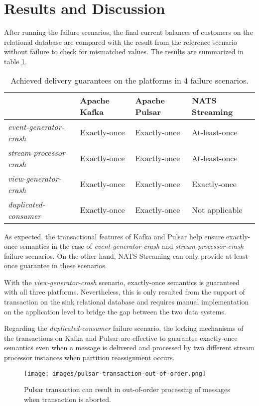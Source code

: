 \section{Results and Discussion}
After running the failure scenarios, the final current balances of customers on the relational database are compared with the result from the reference scenario without failure to check for mismatched values. The results are summarized in table \ref{fig:failurescenariosresult}.
\begin{table}[h]
	\centering
	\begin{tabular}{|l|l|l|l|}
		\hline
		& Apache Kafka & Apache Pulsar & NATS Streaming \\ \hline
		\textit{event-generator-crash}  & Exactly-once & Exactly-once  & At-least-once  \\ \hline
		\textit{stream-processor-crash} & Exactly-once & Exactly-once  & At-least-once  \\ \hline
		\textit{view-generator-crash}   & Exactly-once & Exactly-once  & Exactly-once   \\ \hline
		\textit{duplicated-consumer}    & Exactly-once & Exactly-once  & Not applicable \\ \hline
	\end{tabular}
	\caption{Achieved delivery guarantees on the platforms in 4 failure scenarios.}
	\label{fig:failurescenariosresult}
\end{table}

As expected, the transactional features of Kafka and Pulsar help ensure exactly-once semantics in the case of \emph{event-generator-crash} and \emph{stream-processor-crash} failure scenarios. On the other hand, NATS Streaming can only provide at-least-once guarantee in these scenarios.  

With the \emph{view-generator-crash} scenario, exactly-once semantics is guaranteed with all three platforms. Nevertheless, this is only resulted from the support of transaction on the sink relational database and requires manual implementation on the application level to bridge the gap between the two data systems. 

Regarding the \emph{duplicated-consumer} failure scenario, the locking mechanisms of the transactions on Kafka and Pulsar are effective to guarantee exactly-once semantics even when a message is delivered and processed by two different stream processor instances when partition reassignment occurs. 

\begin{figure}[h]
	\centering
	\texttt{[image: images/pulsar-transaction-out-of-order.png]}
	\caption{Pulsar transaction can result in out-of-order processing of messages when transaction is aborted.}
	\label{fig:pulsaroutofordertransaction}
\end{figure}

